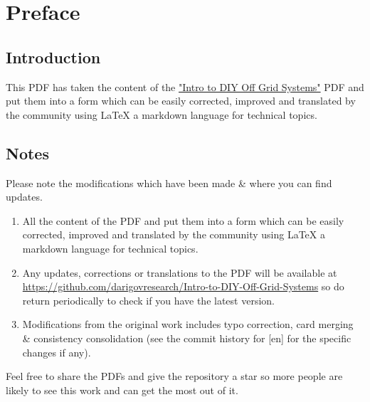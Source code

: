 \documentclass{article}
\theoremstyle{definition}
\theoremstyle{definition}
\theoremstyle{remark}
\begin{document}
\newpage

\tableofcontents

\newpage

{\color{blue}\section{Preface}} %
\label{sec:preface}

  {\color{blue}\subsection*{Introduction}} %
  \label{sub:introduction}
  
    This PDF has taken the content of the \href{https://www.demandenergyequality.org/get-started-with-offgrid}{"Intro to DIY Off Grid Systems"} PDF and put them into a form which can be easily corrected, improved and translated by the community using LaTeX a markdown language for technical topics.


  {\color{blue}\subsection*{Notes}} %
  \label{sub:notes}

    Please note the modifications which have been made \& where you can find updates.

    \begin{enumerate}
      \item All the content of the PDF and put them into a form which can be easily corrected, improved and translated by the community using LaTeX a markdown language for technical topics.
      \item Any updates, corrections or translations to the PDF will be available at \href{https://github.com/darigovresearch/Intro-to-DIY-Off-Grid-Systems}{https://github.com/darigovresearch/Intro-to-DIY-Off-Grid-Systems} so do return periodically to check if you have the latest version.
      \item Modifications from the original work includes typo correction, card merging \& consistency consolidation (see the commit history for [en] for the specific changes if any).
    \end{enumerate}

    Feel free to share the PDFs and give the repository a star so more people are likely to see this work and can get the most out of it.
\end{document}
